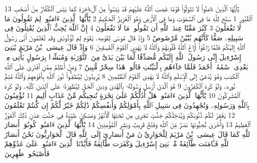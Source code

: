 {\tiny\colorbox{cl_aya}{13}} يَٰٓأَيُّهَا ٱلَّذِينَ ءَامَنُوا۟ لَا تَتَوَلَّوْا۟ قَوْمًا غَضِبَ ٱللَّهُ عَلَيْهِمْ قَدْ يَئِسُوا۟ مِنَ ٱلْءَاخِرَةِ كَمَا يَئِسَ ٱلْكُفَّارُ مِنْ أَصْحَٰبِ ٱلْقُبُورِ
{\tiny\colorbox{cl_aya}{1}} سَبَّحَ لِلَّهِ مَا فِى ٱلسَّمَٰوَٰتِ وَمَا فِى ٱلْأَرْضِ وَهُوَ ٱلْعَزِيزُ ٱلْحَكِيمُ
{\tiny\colorbox{cl_aya}{2}} يَٰٓأَيُّهَا ٱلَّذِينَ ءَامَنُوا۟ لِمَ تَقُولُونَ مَا لَا تَفْعَلُونَ
{\tiny\colorbox{cl_aya}{3}} كَبُرَ مَقْتًا عِندَ ٱللَّهِ أَن تَقُولُوا۟ مَا لَا تَفْعَلُونَ
{\tiny\colorbox{cl_aya}{4}} إِنَّ ٱللَّهَ يُحِبُّ ٱلَّذِينَ يُقَٰتِلُونَ فِى سَبِيلِهِۦ صَفًّا كَأَنَّهُم بُنْيَٰنٌ مَّرْصُوصٌ
{\tiny\colorbox{cl_aya}{5}} وَإِذْ قَالَ مُوسَىٰ لِقَوْمِهِۦ يَٰقَوْمِ لِمَ تُؤْذُونَنِى وَقَد تَّعْلَمُونَ أَنِّى رَسُولُ ٱللَّهِ إِلَيْكُمْ فَلَمَّا زَاغُوٓا۟ أَزَاغَ ٱللَّهُ قُلُوبَهُمْ وَٱللَّهُ لَا يَهْدِى ٱلْقَوْمَ ٱلْفَٰسِقِينَ
{\tiny\colorbox{cl_aya}{6}} وَإِذْ قَالَ عِيسَى ٱبْنُ مَرْيَمَ يَٰبَنِىٓ إِسْرَٰٓءِيلَ إِنِّى رَسُولُ ٱللَّهِ إِلَيْكُم مُّصَدِّقًا لِّمَا بَيْنَ يَدَىَّ مِنَ ٱلتَّوْرَىٰةِ وَمُبَشِّرًۢا بِرَسُولٍ يَأْتِى مِنۢ بَعْدِى ٱسْمُهُۥٓ أَحْمَدُ فَلَمَّا جَآءَهُم بِٱلْبَيِّنَٰتِ قَالُوا۟ هَٰذَا سِحْرٌ مُّبِينٌ
{\tiny\colorbox{cl_aya}{7}} وَمَنْ أَظْلَمُ مِمَّنِ ٱفْتَرَىٰ عَلَى ٱللَّهِ ٱلْكَذِبَ وَهُوَ يُدْعَىٰٓ إِلَى ٱلْإِسْلَٰمِ وَٱللَّهُ لَا يَهْدِى ٱلْقَوْمَ ٱلظَّٰلِمِينَ
{\tiny\colorbox{cl_aya}{8}} يُرِيدُونَ لِيُطْفِـُٔوا۟ نُورَ ٱللَّهِ بِأَفْوَٰهِهِمْ وَٱللَّهُ مُتِمُّ نُورِهِۦ وَلَوْ كَرِهَ ٱلْكَٰفِرُونَ
{\tiny\colorbox{cl_aya}{9}} هُوَ ٱلَّذِىٓ أَرْسَلَ رَسُولَهُۥ بِٱلْهُدَىٰ وَدِينِ ٱلْحَقِّ لِيُظْهِرَهُۥ عَلَى ٱلدِّينِ كُلِّهِۦ وَلَوْ كَرِهَ ٱلْمُشْرِكُونَ
{\tiny\colorbox{cl_aya}{10}} يَٰٓأَيُّهَا ٱلَّذِينَ ءَامَنُوا۟ هَلْ أَدُلُّكُمْ عَلَىٰ تِجَٰرَةٍ تُنجِيكُم مِّنْ عَذَابٍ أَلِيمٍ
{\tiny\colorbox{cl_aya}{11}} تُؤْمِنُونَ بِٱللَّهِ وَرَسُولِهِۦ وَتُجَٰهِدُونَ فِى سَبِيلِ ٱللَّهِ بِأَمْوَٰلِكُمْ وَأَنفُسِكُمْ ذَٰلِكُمْ خَيْرٌ لَّكُمْ إِن كُنتُمْ تَعْلَمُونَ
{\tiny\colorbox{cl_aya}{12}} يَغْفِرْ لَكُمْ ذُنُوبَكُمْ وَيُدْخِلْكُمْ جَنَّٰتٍ تَجْرِى مِن تَحْتِهَا ٱلْأَنْهَٰرُ وَمَسَٰكِنَ طَيِّبَةً فِى جَنَّٰتِ عَدْنٍ ذَٰلِكَ ٱلْفَوْزُ ٱلْعَظِيمُ
{\tiny\colorbox{cl_aya}{13}} وَأُخْرَىٰ تُحِبُّونَهَا نَصْرٌ مِّنَ ٱللَّهِ وَفَتْحٌ قَرِيبٌ وَبَشِّرِ ٱلْمُؤْمِنِينَ
{\tiny\colorbox{cl_aya}{14}} يَٰٓأَيُّهَا ٱلَّذِينَ ءَامَنُوا۟ كُونُوٓا۟ أَنصَارَ ٱللَّهِ كَمَا قَالَ عِيسَى ٱبْنُ مَرْيَمَ لِلْحَوَارِيِّۦنَ مَنْ أَنصَارِىٓ إِلَى ٱللَّهِ قَالَ ٱلْحَوَارِيُّونَ نَحْنُ أَنصَارُ ٱللَّهِ فَـَٔامَنَت طَّآئِفَةٌ مِّنۢ بَنِىٓ إِسْرَٰٓءِيلَ وَكَفَرَت طَّآئِفَةٌ فَأَيَّدْنَا ٱلَّذِينَ ءَامَنُوا۟ عَلَىٰ عَدُوِّهِمْ فَأَصْبَحُوا۟ ظَٰهِرِينَ
